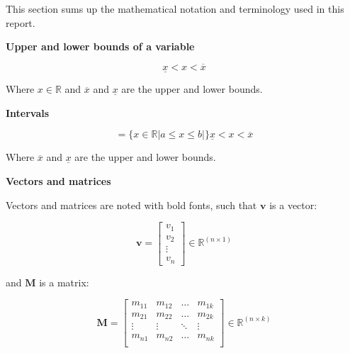 This section sums up the mathematical notation and terminology used in this report.

\textbf{Upper and lower bounds of a variable}

\begin{equation}
\underline{x} < x < \overline{x} 
\end{equation}

 Where $x \in {\mathbb{R}} $ and $\overline{x}$ and $\underline{x}$ are the upper and lower bounds.
 
 \textbf{Intervals}

\begin{equation}
	[a,b] =  \{x \in \mathbb{R}|a\leq x \leq b|\}
\underline{x} < x < \overline{x} 
\end{equation}

 Where $\overline{x}$ and $\underline{x}$ are the upper and lower bounds.

 \textbf{Vectors and matrices}

Vectors and matrices are noted with bold fonts, such that $\bm{v}$ is a vector:

\begin{equation}
\bm{v} = 
\begin{bmatrix}

		 v_1 	\\
		 v_2 	\\
		 \vdots \\
		 v_n

\end{bmatrix}
\in \pmb{{\mathbb{R}}}^{(n \times 1)}
\end{equation}

and $\bm{M}$ is a matrix:

\begin{equation}
\bm{M} = 
\begin{bmatrix}

		 m_{11} & m_{12} & \hdots & m_{1k}	\\
		 m_{21} & m_{22} & \hdots & m_{2k}	\\
		 \vdots & \vdots & \ddots & \vdots	\\
		 m_{n1} & m_{n2} & \hdots &m_{nk} \\

\end{bmatrix}
\in \pmb{{\mathbb{R}}}^{(n \times k)}
\end{equation}


